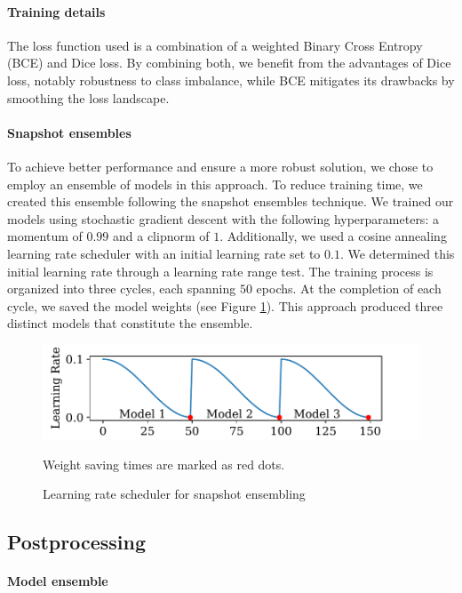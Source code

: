 \documentclass[sigconf]{acmart}
\begin{document}
\paragraph{Training details} The loss function used is a combination of a weighted Binary Cross Entropy (BCE) and Dice loss. By combining both, we benefit from the advantages of Dice loss, notably robustness to class imbalance, while BCE mitigates its drawbacks by smoothing the loss landscape\cite{Jadon_2020}.

\paragraph{Snapshot ensembles} To achieve better performance and ensure a more robust solution, we chose to employ an ensemble of models in this approach. To reduce training time, we created this ensemble following the snapshot ensembles technique\cite{huang2017snapshot}. We trained our models using stochastic gradient descent with the following hyperparameters: a momentum of $0.99$ and a clipnorm of $1$. Additionally, we used a cosine annealing learning rate scheduler\cite{DBLP:journals/corr/LoshchilovH16a} with an initial learning rate set to $0.1$. We determined this initial learning rate through a learning rate range test. The training process is organized into three cycles, each spanning $50$ epochs. At the completion of each cycle, we saved the model weights (see Figure \ref{fig:figure3}). This approach produced three distinct models that constitute the ensemble.

\begin{figure}[t!]
\includegraphics[width=\columnwidth]{images/lr_scheduler.pdf}
\caption{Learning rate scheduler for snapshot ensembling}
\small Weight saving times are marked as red dots.
\label{fig:figure3}
\end{figure}

\subsection{Postprocessing}

\paragraph{Model ensemble} 
\end{document}
